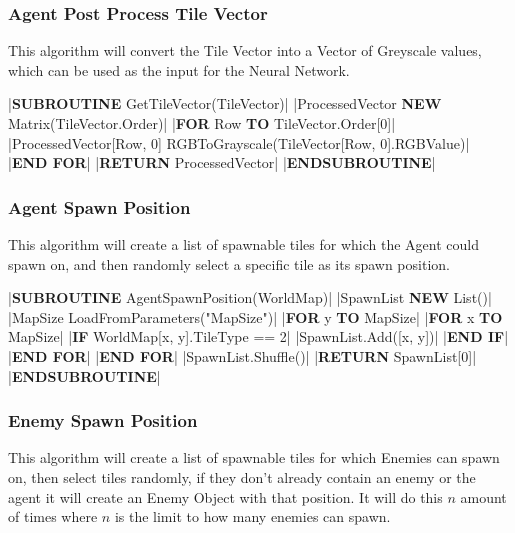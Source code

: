 \begin{flushleft}
                \vspace{0.5cm}
            \subsubsection{Agent Post Process Tile Vector}
                This algorithm will convert the Tile Vector into a Vector of Greyscale values, which can be used as the input for the Neural
                Network.

                \vspace{0.2cm}
                \begin{pseudocode}
|\textbf{SUBROUTINE} GetTileVector(TileVector)|
    |ProcessedVector \leftarrow \textbf{NEW} Matrix(TileVector.Order)|
    |\textbf{FOR} Row  \textbf{TO} TileVector.Order[0]|
        |ProcessedVector[Row, 0] \leftarrow RGBToGrayscale(TileVector[Row, 0].RGBValue)|
    |\textbf{END FOR}|
    |\textbf{RETURN} ProcessedVector|
|\textbf{ENDSUBROUTINE}|
                \end{pseudocode}
                
                \vspace{0.5cm}
            \subsubsection{Agent Spawn Position}
                This algorithm will create a list of spawnable tiles for which the Agent could spawn on, and then randomly select a specific
                tile as its spawn position.

                \vspace{0.2cm}
                \begin{pseudocode}
|\textbf{SUBROUTINE} AgentSpawnPosition(WorldMap)|
    |SpawnList \leftarrow \textbf{NEW} List()|
    |MapSize \leftarrow LoadFromParameters("MapSize")|
    |\textbf{FOR} y  \textbf{TO} MapSize|
        |\textbf{FOR} x  \textbf{TO} MapSize|
            |\textbf{IF} WorldMap[x, y].TileType == 2|
                |SpawnList.Add([x, y])|
            |\textbf{END IF}|
        |\textbf{END FOR}|
    |\textbf{END FOR}|
    |SpawnList.Shuffle()|
    |\textbf{RETURN} SpawnList[0]|
|\textbf{ENDSUBROUTINE}|
                \end{pseudocode}

                \vspace{0.5cm}
            \subsubsection{Enemy Spawn Position}
                This algorithm will create a list of spawnable tiles for which Enemies can spawn on, then select tiles randomly, if they don't
                already contain an enemy or the agent it will create an Enemy Object with that position. It will do this $n$ amount of times 
                where $n$ is the limit to how many enemies can spawn.
                

\end{flushleft}
